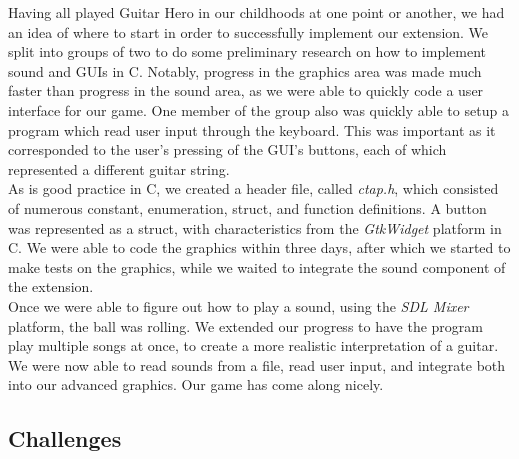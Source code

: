 \documentclass[11pt]{article}
\begin{document}
Having all played Guitar Hero in our childhoods at one point or another, we had an idea of where to start in order to successfully implement our extension. We split into groups of two to do some preliminary research on how to implement sound and GUIs in C. Notably, progress in the graphics area was made much faster than progress in the sound area, as we were able to quickly code a user interface for our game. One member of the group also was quickly able to setup a program which read user input through the keyboard. This was important as it corresponded to the user's pressing of the GUI's buttons, each of which represented a different guitar string. 
\\ \hspace{10mm} As is good practice in C, we created a header file, called \emph{ctap.h}, which consisted of numerous constant, enumeration, struct, and function definitions. A button was represented as a struct, with characteristics from the \emph{GtkWidget} platform in C. We were able to code the graphics within three days, after which we started to make tests on the graphics, while we waited to integrate the sound component of the extension.
\\ \hspace{10mm} Once we were able to figure out how to play a sound, using the \emph{SDL Mixer} platform, the ball was rolling. We extended our progress to have the program play multiple songs at once, to create a more realistic interpretation of a guitar. We were now able to read sounds from a file, read user input, and integrate both into our advanced graphics. Our game has come along nicely.

\subsection{Challenges}
\end{document}
